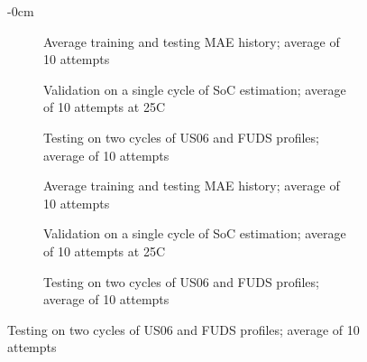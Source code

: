 \begin{figure}[H]
    \centering
    \begin{adjustwidth}{-\extralength}{0cm}
    \begin{subfigure}[b]{0.425\textwidth}
        \centering
        
        \caption{Average training and testing MAE history; average of 10 attempts}
    \end{subfigure}
    \hfill
    \begin{subfigure}[b]{0.425\textwidth}
        \centering
        
        \caption{Validation on a single cycle of SoC estimation; average of 10 attempts at 25\textdegree{}C}
    \end{subfigure}
    \hfill
    \begin{subfigure}[b]{0.425\textwidth}
        \centering
        
        \caption{Testing on two cycles of US06 and FUDS profiles; average of 10 attempts}
        \label{subfig:Model-1res-DSTvsFUDS}
    \end{subfigure}
    \begin{subfigure}[b]{0.425\textwidth}
        \centering
        
        \caption{Average training and testing MAE history; average of 10 attempts}
    \end{subfigure}
    \hfill
    \begin{subfigure}[b]{0.425\textwidth}
        \centering
        
        \caption{Validation on a single cycle of SoC estimation; average of 10 attempts at 25\textdegree{}C}
    \end{subfigure}
    \hfill
    \begin{subfigure}[b]{0.425\textwidth}
        \centering
        
        \caption{Testing on two cycles of US06 and FUDS profiles; average of 10 attempts}
    \end{subfigure}

\end{adjustwidth}
\end{figure}
